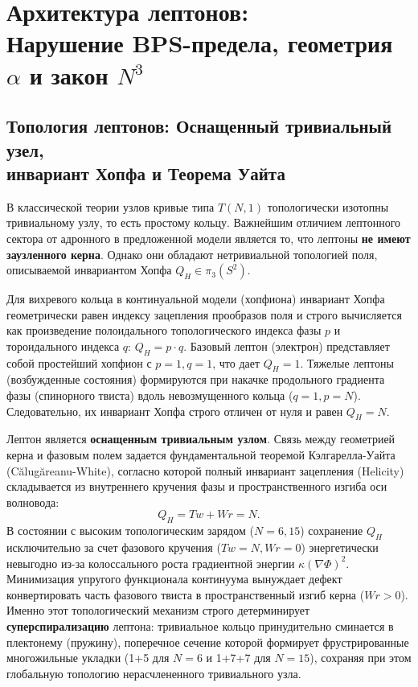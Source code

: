 \documentclass[11pt,a4paper]{article}
\begin{document}
	\section{Архитектура лептонов:\\ Нарушение BPS-предела, геометрия $\alpha$ и закон $N^3$}
	
	\subsection{Топология лептонов: Оснащенный тривиальный узел,\\ инвариант Хопфа и Теорема Уайта}
	В классической теории узлов кривые типа $T(N,1)$ топологически изотопны тривиальному узлу, то есть простому кольцу. Важнейшим отличием лептонного сектора от адронного в предложенной модели является то, что лептоны \textbf{не имеют заузленного керна}. Однако они обладают нетривиальной топологией поля, описываемой инвариантом Хопфа $Q_H \in \pi_3(S^2)$.
	
	Для вихревого кольца в континуальной модели (хопфиона) инвариант Хопфа геометрически равен индексу зацепления прообразов поля и строго вычисляется как произведение полоидального топологического индекса фазы $p$ и тороидального индекса $q$: $Q_H = p \cdot q$.
	Базовый лептон (электрон) представляет собой простейший хопфион с $p=1, q=1$, что дает $Q_H = 1$. Тяжелые лептоны (возбужденные состояния) формируются при накачке продольного градиента фазы (спинорного твиста) вдоль невозмущенного кольца ($q=1, p=N$). Следовательно, их инвариант Хопфа строго отличен от нуля и равен $Q_H = N$.
	
	Лептон является \textbf{оснащенным тривиальным узлом}. Связь между геометрией керна и фазовым полем задается фундаментальной теоремой Кэлгарелла-Уайта (Călugăreanu-White), согласно которой полный инвариант зацепления (Helicity) складывается из внутреннего кручения фазы и пространственного изгиба оси волновода:
	\begin{equation}
		Q_H = Tw + Wr = N.
	\end{equation}
	В состоянии с высоким топологическим зарядом ($N=6, 15$) сохранение $Q_H$ исключительно за счет фазового кручения ($Tw=N, Wr=0$) энергетически невыгодно из-за колоссального роста градиентной энергии $\kappa (\nabla \Phi)^2$. Минимизация упругого функционала континуума вынуждает дефект конвертировать часть фазового твиста в пространственный изгиб керна ($Wr > 0$).
	Именно этот топологический механизм строго детерминирует \textbf{суперспирализацию} лептона: тривиальное кольцо принудительно сминается в плектонему (пружину), поперечное сечение которой формирует фрустрированные многожильные укладки (1+5 для $N=6$ и 1+7+7 для $N=15$), сохраняя при этом глобальную топологию нерасчлененного тривиального узла.
	
\end{document}
